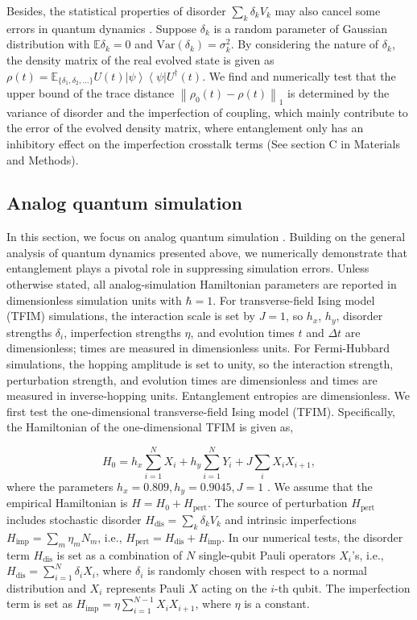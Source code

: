 \documentclass[12pt]{article}
\newcommand{\ket}[1]{\left|#1\right\rangle}
\newcommand{\bra}[1]{\left\langle #1\right|}
\newcommand{\norm}[1]{\left\lVert #1\right\rVert}
\begin{document}
Besides, the statistical properties of disorder $\sum_k\delta_k V_k$ may also cancel some errors in quantum dynamics \cite{https://doi.org/10.4230/lipics.tqc.2024.2}.
Suppose $\delta_k$ is a random parameter of  Gaussian distribution with $\mathbb{E} \delta _k=0$ and $\text{Var}(\delta_k)=\sigma^2_k$. By considering the nature of $\delta_k$, the density matrix of the real evolved state is given as 
$\rho(t)=  \mathbb{E}_{\{\delta_1,\delta_2,...\}}U (t)\ket{\psi}\bra{\psi}U^\dagger(t)$.
We find and numerically test that the upper bound of the trace distance $\norm{ \rho_0(t)-\rho(t) }_1$ is determined by the variance of disorder and the imperfection of coupling, which mainly contribute to the error of the evolved density matrix, where entanglement only has an inhibitory effect on the imperfection crosstalk terms (See section C in Materials and Methods).

\subsection*{Analog quantum simulation}

In this section, we focus on analog quantum simulation \cite{buluta2009quantum,farhiAnalogAnalogueDigital1998,daley2022practical}. Building on the general analysis of quantum dynamics presented above, we numerically demonstrate that entanglement plays a pivotal role in suppressing simulation errors. Unless otherwise stated, all analog-simulation Hamiltonian parameters are reported in dimensionless simulation units with $\hbar=1$. For transverse-field Ising model (TFIM) simulations, the interaction scale is set by $J=1$, so $h_x$, $h_y$, disorder strengths $\delta_i$, imperfection strengths $\eta$, and evolution times $t$ and $\Delta t$ are dimensionless; times are measured in dimensionless units. For Fermi-Hubbard simulations, the hopping amplitude is set to unity, so the interaction strength, perturbation strength, and evolution times are dimensionless and times are measured in inverse-hopping units. Entanglement entropies are dimensionless.
We first test the one-dimensional transverse-field Ising model (TFIM). Specifically, the Hamiltonian of the one-dimensional TFIM is given as, 

\begin{equation}
    H_0=h_x\sum_{i=1}^NX_i+h_y\sum_{i=1}^NY_i+J\sum_iX_iX_{i+1},
    \label{eq:TFIM}
\end{equation}
 where the parameters $h_x=0.809,h_y=0.9045,J=1$ \cite{PRXQuantum.4.010311}. 
We assume that the empirical Hamiltonian is $H=H_0+H_{\text{pert}}$.
The source of perturbation $H_{\text{pert}}$ includes stochastic disorder $H_{\text{dis}}=\sum_k\delta_k V_k$ and
intrinsic imperfections $H_{\text{imp}}=\sum_m \eta_m N_m$, i.e., $H_{\text{pert}}=H_{\text{dis}}+H_{\text{imp}}$. 
In our numerical tests, the disorder term $H_{\text{dis}}$ is set as a combination of $N$ single-qubit Pauli operators $X_i$'s, i.e., $H_{\text{dis}}=\sum_{i=1}^N\delta_iX_i$, where $\delta_i$ is randomly chosen with respect to a normal distribution and $X_i$ represents Pauli $X$ acting on the $i$-th qubit. The imperfection term is set as $H_{\text{imp}}=\eta\sum_{i=1}^{N-1}X_iX_{i+1}$, where $\eta$ is a constant.
\end{document}
